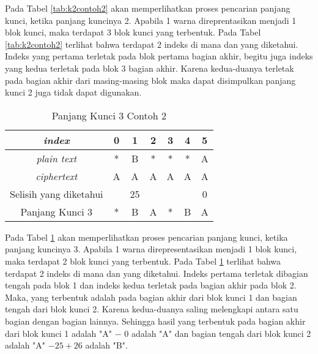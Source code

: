 	Pada Tabel \ref{tab:k2contoh2} akan memperlihatkan proses pencarian panjang kunci, ketika panjang kuncinya 2. Apabila 1 warna direprentasikan menjadi 1 blok kunci, maka terdapat 3 blok kunci yang terbentuk. Pada Tabel \ref{tab:k2contoh2} terlihat bahwa terdapat 2 indeks di mana \plaintext dan \ciphertext yang diketahui. Indeks yang pertama terletak pada blok pertama bagian akhir, begitu juga indeks yang kedua terletak pada blok 3 bagian akhir. Karena kedua-duanya terletak pada bagian akhir dari masing-masing blok maka dapat disimpulkan panjang kunci 2 juga tidak dapat digunakan.
	\\
	\begin{table}[H]
	 	\centering
	 	\caption{Panjang Kunci 3 Contoh 2}
	 	\setlength{\arrayrulewidth}{.08em}
	 	\begin{tabular}{|c|c|c|c|c|c|c|}\hline
		\textit{index}&0&1&2&3&4&5\\ \hline
	 	\textit{plain text}&\cellcolor{blue!15}*&\cellcolor{blue!15}B&\cellcolor{blue!15}*&\cellcolor{green!15}*&\cellcolor{green!15}*&\cellcolor{green!15}A\\ \hline
	 	\textit{ciphertext}&\cellcolor{blue!15}A&\cellcolor{blue!15}A&\cellcolor{blue!15}A&\cellcolor{green!15}A&\cellcolor{green!15}A&\cellcolor{green!15}A\\ \hline
	 	Selisih yang diketahui& &25& & & &0\\ \hline
	 	Panjang Kunci 3 &*&B&A&*&B&A \\ \hline
	 	\end{tabular}
	 	\label{tab:k3contoh2}
	\end{table}	
	Pada Tabel \ref{tab:k3contoh2} akan memperlihatkan proses pencarian panjang kunci, ketika panjang kuncinya 3. Apabila 1 warna direpresentasikan menjadi 1 blok kunci, maka terdapat 2 blok kunci yang terbentuk. Pada Tabel \ref{tab:k3contoh2} terlihat bahwa terdapat 2 indeks di mana \plaintext dan \ciphertext yang diketahui. Indeks  pertama terletak dibagian tengah pada blok 1 dan indeks kedua terletak pada bagian akhir pada blok 2. Maka,  \plaintext yang terbentuk adalah pada bagian akhir dari blok kunci 1 dan bagian tengah dari blok kunci 2. Karena kedua-duanya saling melengkapi antara satu bagian dengan bagian lainnya. Sehingga hasil yang terbentuk pada bagian akhir dari blok kunci 1 adalah "A" $-$ $0$ adalah "A" dan bagian tengah dari blok kunci 2 adalah "A" $- 25+26$ adalah "B". 
	\\
